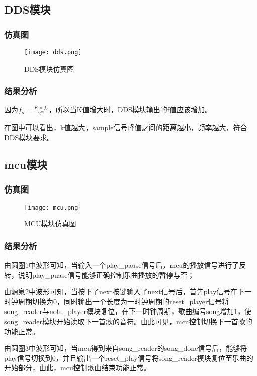 \documentclass{../source/zjureport}
\begin{document}
    \subsection{DDS模块}
        \subsubsection{仿真图}
        \begin{figure}[htp]
            \centering
            \texttt{[image: dds.png]}
            \caption{DDS模块仿真图}
        \end{figure}

        \subsubsection{结果分析}
        因为$f_o = \frac{K\times f_c}{2^m}$，所以当K值增大时，DDS模块输出的f值应该增加。

        在图中可以看出，k值越大，sample信号峰值之间的距离越小，频率越大，符合DDS模块要求。

    \subsection{mcu模块}
        \subsubsection{仿真图}
        \begin{figure}[htp]
            \centering
            \texttt{[image: mcu.png]}
            \caption{MCU模块仿真图}
        \end{figure}

        \subsubsection{结果分析}
        由圆圈1中波形可知，当输入一个play_pause信号后，mcu的播放信号进行了反转，说明play_puase信号能够正确控制乐曲播放的暂停与否；
        
        由源泉2中波形可知，当按下了next按键输入了next信号后，首先play信号在下一时钟周期切换为0，同时输出一个长度为一时钟周期的reset_player信号将song_reader与note_player模块复位，在下一时钟周期，歌曲编号song增加1，使song_reader模块开始读取下一首歌的音符。由此可见，mcu控制切换下一首歌的功能正常。
        
        由圆圈3中波形可知，当mcu得到来自song_reader的song_done信号后，能够将play信号切换到0，并且输出一个reset_play信号将song_reader模块复位至乐曲的开始部分，由此，mcu控制歌曲结束功能正常。
\end{document}
